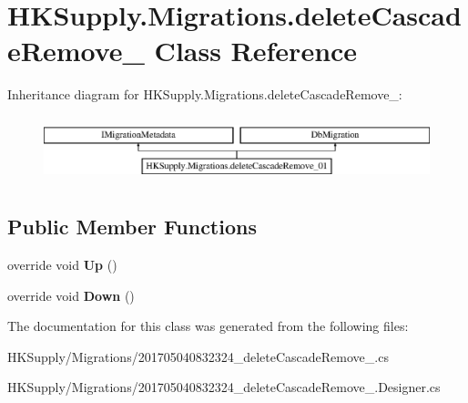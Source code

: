 \hypertarget{class_h_k_supply_1_1_migrations_1_1delete_cascade_remove__01}{}\section{H\+K\+Supply.\+Migrations.\+delete\+Cascade\+Remove\+\_ Class Reference}
\label{class_h_k_supply_1_1_migrations_1_1delete_cascade_remove__01}
Inheritance diagram for H\+K\+Supply.\+Migrations.\+delete\+Cascade\+Remove\+\_\+:\begin{figure}[H]
\begin{center}
\leavevmode
\includegraphics[height=1.911263cm]{class_h_k_supply_1_1_migrations_1_1delete_cascade_remove__01}
\end{center}
\end{figure}
\subsection*{Public Member Functions}
\begin{DoxyCompactItemize}
\item 
\mbox{\label{class_h_k_supply_1_1_migrations_1_1delete_cascade_remove__01_a4219c2f4694e983617ffe6799c9a0251}} 
override void {\bfseries Up} ()
\item 
\mbox{\label{class_h_k_supply_1_1_migrations_1_1delete_cascade_remove__01_a8f5f7bb884d5a4e0bf773257b11689c9}} 
override void {\bfseries Down} ()
\end{DoxyCompactItemize}


The documentation for this class was generated from the following files\+:\begin{DoxyCompactItemize}
\item 
H\+K\+Supply/\+Migrations/201705040832324\+\_\+delete\+Cascade\+Remove\+\_.\+cs\item 
H\+K\+Supply/\+Migrations/201705040832324\+\_\+delete\+Cascade\+Remove\+\_.\+Designer.\+cs\end{DoxyCompactItemize}
